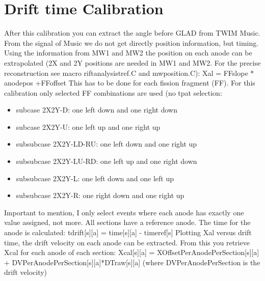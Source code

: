 \documentclass{report}
\begin{document}
\section{Drift time Calibration}
After this calibration you can extract the angle before GLAD from TWIM Music. From the signal of Music we do not get directly position information, but timing. Using the information from MW1 and MW2 the position on each anode can be extrapolated (2X and 2Y positions are needed in MW1 and MW2. For the precise reconstruction see macro rift\textunderscore analysis\textunderscore tref.C and mw\textunderscore position.C):\newline
Xal = FF\textunderscore slope * anode\textunderscore pos +FF\textunderscore offset\newline
This has to be done for each fission fragment (FF).\newline
For this calibration only selected FF combinations are used (no tpat selection:\newline
\begin{itemize}
	\item subcase 2X2Y-D: one left down and one right down
	\item subcase 2X2Y-U: one left up and one right up
	\item subsubcase 2X2Y-LD-RU: one left down and one right up
	\item subsubcase 2X2Y-LU-RD: one left up and one right down
	\item subsubcase 2X2Y-L: one left down and one left up
	\item subsubcase 2X2Y-R: one right down and one right up
\end{itemize}
Important to mention, I only select events where each anode has exactly one value assigned, not more. All sections have a reference anode. The time for the anode is calculated:\newline
t\textunderscore drift[s][a] = time[s][a] - time\textunderscore ref[s] \newline
Plotting Xal versus drift time, the drift velocity on each anode can be extracted.\newline
From this you retrieve Xcal for each anode of each section:\newline
Xcal[s][a] = X\textunderscore OffsetPerAnodePerSection[s][a] + DV\textunderscore PerAnodePerSection[s][a]*DTraw[s][a] (where DV\textunderscore PerAnodePerSection is the drift velocity)
\end{document}
